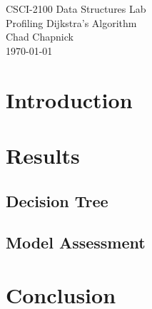 \documentclass[technote]{IEEEtran}
\begin{document}
\begin{titlepage}
    \vspace*{\fill}
    \begin{center}
        {\Huge CSCI-2100 Data Structures Lab}\\[0.3cm]
        {\huge Profiling Dijkstra's Algorithm}\\[0.6cm]
        {\Large Chad Chapnick}\\[0.4cm]
        {\small\today}
    \end{center}
    \vspace*{\fill}
\end{titlepage}

\section{Introduction}
\lipsum[1]

\section{Results}
\lipsum[1]
\subsection{Decision Tree}
\lipsum[1]
\subsection{Model Assessment}
\lipsum[1]

\section{Conclusion}
\lipsum[1]

\nocite{*}


\end{document}
